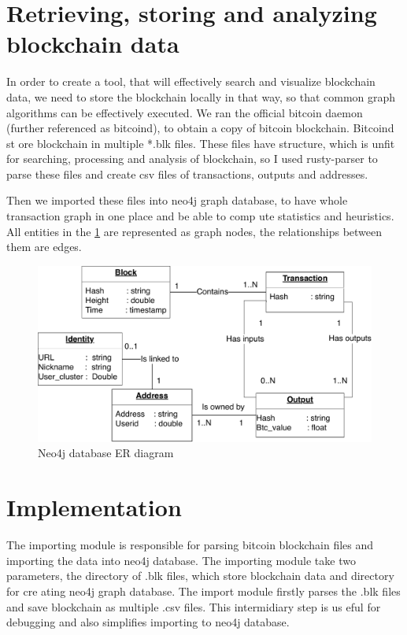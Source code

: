 \documentclass[
  digital, %
  table,   %
  lof,     %
  lot,     %
  oneside
]{fithesis3}
\begin{document}
\section{Retrieving, storing and analyzing blockchain data}
In order to create a tool, that will effectively search and visualize blockchain data,
we need to store the blockchain locally in that way, so that common graph algorithms can be effectively executed.
We ran the official bitcoin daemon (further referenced as bitcoind), to obtain a copy of bitcoin blockchain. Bitcoind st
ore blockchain in multiple *.blk files.
These files have structure, which is unfit for searching, processing and analysis of blockchain, so I used rusty-parser 
to parse these files and create csv files of transactions, outputs and addresses.

Then we imported these files into neo4j graph database, to have whole transaction graph in one place and be able to comp
ute statistics and heuristics.
All entities in the \ref{neo4jschema} are represented as graph nodes, the relationships between them are edges.
\begin{figure}[!htb]
    \centering
    \includegraphics[width=1\textwidth]{neo4j-schema}
    \caption{Neo4j database ER diagram}
    \label{neo4jschema}
\end{figure}

\section{Implementation}

The importing module is responsible for parsing bitcoin blockchain files and importing the data into neo4j database.
The importing module take two parameters, the directory of .blk files, which store blockchain data and directory for cre
ating neo4j graph database.
The import module firstly parses the .blk files and save blockchain as multiple .csv files. This intermidiary step is us
eful for debugging and also simplifies importing to neo4j database.
\end{document}
